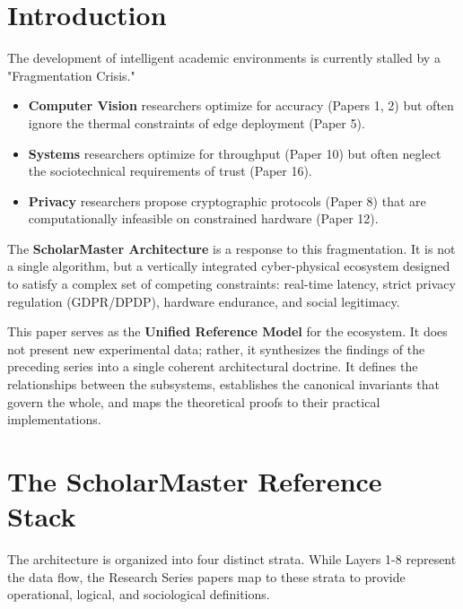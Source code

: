 \documentclass[conference]{IEEEtran}
\theoremstyle{definition}
\begin{document}
\section{Introduction}
The development of intelligent academic environments is currently stalled by a "Fragmentation Crisis." 
\begin{itemize}
    \item \textbf{Computer Vision} researchers optimize for accuracy (Papers 1, 2) but often ignore the thermal constraints of edge deployment (Paper 5).
    \item \textbf{Systems} researchers optimize for throughput (Paper 10) but often neglect the sociotechnical requirements of trust (Paper 16).
    \item \textbf{Privacy} researchers propose cryptographic protocols (Paper 8) that are computationally infeasible on constrained hardware (Paper 12).
\end{itemize}

The \textbf{ScholarMaster Architecture} is a response to this fragmentation. It is not a single algorithm, but a vertically integrated cyber-physical ecosystem designed to satisfy a complex set of competing constraints: real-time latency, strict privacy regulation (GDPR/DPDP), hardware endurance, and social legitimacy.

This paper serves as the \textbf{Unified Reference Model} for the ecosystem. It does not present new experimental data; rather, it synthesizes the findings of the preceding series into a single coherent architectural doctrine. It defines the relationships between the subsystems, establishes the canonical invariants that govern the whole, and maps the theoretical proofs to their practical implementations.

\section{The ScholarMaster Reference Stack}

The architecture is organized into four distinct strata. While Layers 1-8 represent the data flow, the Research Series papers map to these strata to provide operational, logical, and sociological definitions.
\end{document}
